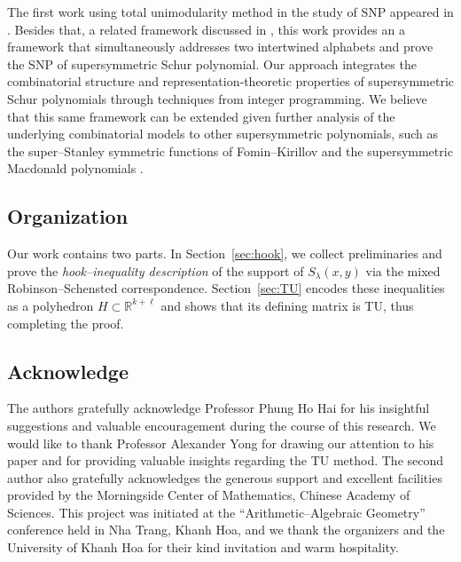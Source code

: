 \documentclass[12pt,a4paper,oneside]{amsart}
\theoremstyle{definition}
\newcommand{\R}{\mathbb{R}}
\begin{document}
The first work using total unimodularity method in the study of SNP appeared in \cite{ARY21}. Besides that, a related framework discussed in \cite{PZ23}, this work provides an a framework that simultaneously addresses two intertwined alphabets and prove the SNP of supersymmetric Schur polynomial. Our approach integrates the combinatorial structure and representation‑theoretic properties of supersymmetric Schur polynomials through techniques from integer programming. We believe that this same framework can be extended given further analysis of the underlying combinatorial models to other supersymmetric polynomials, such as the super–Stanley symmetric functions of Fomin–Kirillov \cite{FK96} and the supersymmetric Macdonald polynomials \cite{BFDLM12a}.



\subsection*{Organization}\label{subsec:organization}

Our work contains two parts. In Section~\ref{sec:hook}, we collect preliminaries and prove the \emph{hook–inequality description} of the support of \(S_{\lambda}(x,y)\) via the mixed Robinson--Schensted correspondence. Section~\ref{sec:TU} encodes these inequalities as a polyhedron \(H\subset\R^{k+\ell}\) and shows that its defining matrix is TU, thus completing the proof.

\subsection*{Acknowledge} 
The authors gratefully acknowledge Professor Phung Ho Hai for his insightful suggestions and valuable encouragement during the course of this research. We would like to thank Professor Alexander Yong for drawing our attention to his paper \cite{ARY21} and for providing valuable insights regarding the TU method. The second author also gratefully acknowledges the generous support and excellent facilities provided by the Morningside Center of Mathematics, Chinese Academy of Sciences. This project was initiated at the “Arithmetic–Algebraic Geometry” conference held in Nha Trang, Khanh Hoa, and we thank the organizers and the University of Khanh Hoa for their kind invitation and warm hospitality.
\end{document}
